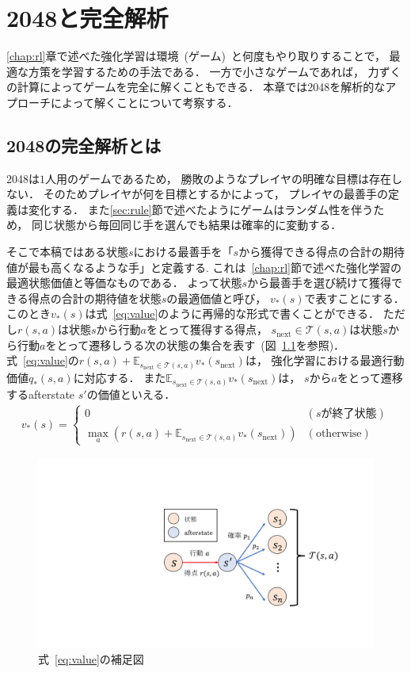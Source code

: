 \chapter{2048と完全解析}
\label{chap:solving}
\ref{chap:rl}章で述べた強化学習は環境~(ゲーム)~と何度もやり取りすることで， 最適な方策を学習するための手法である．
一方で小さなゲームであれば， 力ずくの計算によってゲームを完全に解くこともできる．
本章では2048を解析的なアプローチによって解くことについて考察する．

\section{2048の完全解析とは}
\label{sec:solving}
2048は$1$人用のゲームであるため， 勝敗のようなプレイヤの明確な目標は存在しない．
そのためプレイヤが何を目標とするかによって， プレイヤの最善手の定義は変化する．
また\ref{sec:rule}節で述べたようにゲームはランダム性を伴うため， 同じ状態から毎回同じ手を選んでも結果は確率的に変動する．

そこで本稿ではある状態$s$における最善手を「$s$から獲得できる得点の合計の期待値が最も高くなるような手」と定義する.
これは~\ref{chap:rl}節で述べた強化学習の最適状態価値と等価なものである．
よって状態$s$から最善手を選び続けて獲得できる得点の合計の期待値を状態$s$の最適価値と呼び， $v_*(s)$で表すことにする．
このとき$v_*(s)$は式~\ref{eq:value}のように再帰的な形式で書くことができる．
ただし$r(s,a)$は状態$s$から行動$a$をとって獲得する得点， $s_\text{next} \in \mathcal{T}(s,a)$は状態$s$から行動$a$をとって遷移しうる次の状態の集合を表す~(図~\ref{fig:state_afterstate}を参照)．
式~\ref{eq:value}の$r(s,a) + \mathbb{E}_{s_\text{next} \in \mathcal{T}(s,a)} v_*(s_\text{next})$は， 強化学習における最適行動価値$q_*(s,a)$に対応する．
また$\mathbb{E}_{s_\text{next} \in \mathcal{T}(s,a)} v_*(s_\text{next})$は， $s$から$a$をとって遷移するafterstate $s'$の価値といえる．
\begin{align}
    v_*(s) =
    \begin{cases}
        0 & (s \text{が終了状態}) \\
        \max_a \left(r(s,a) + \mathbb{E}_{s_\text{next} \in \mathcal{T}(s,a)} v_*(s_\text{next}) \right) & (\text{otherwise})
    \end{cases}
    \label{eq:value}
\end{align}

\begin{figure}[t]
    \centering
    \includegraphics[width=0.6\linewidth{}]{figures/value_function_.pdf}
    \caption{式~\ref{eq:value}の補足図}
    \label{fig:state_afterstate}
\end{figure}

